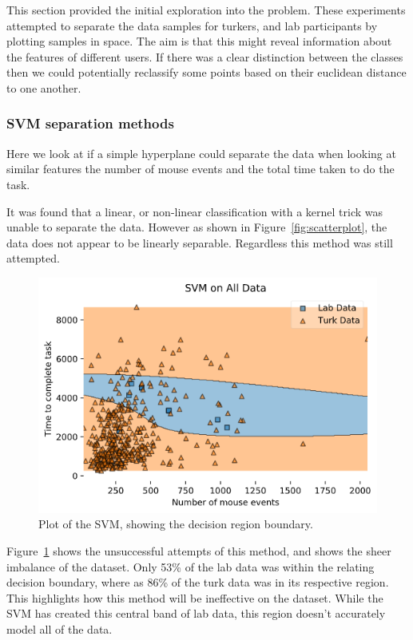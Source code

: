 \documentclass{article}
\begin{document}
This section provided the initial exploration into the problem.
These experiments attempted to separate the data samples for turkers, and lab participants by plotting samples in space.
The aim is that this might reveal information about the features of different users.
If there was a clear distinction between the classes then we could potentially reclassify some points based on their euclidean distance to one another.

\subsubsection{SVM separation methods}
Here we look at if a simple hyperplane could separate the data when looking at similar features the number of mouse events and the total time taken to do the task. 

It was found that a linear, or non-linear classification with a kernel trick was unable to separate the data.
However as shown in Figure~\ref{fig:scatterplot}, the data does not appear to be linearly separable.
Regardless this method was still attempted.

\begin{figure}[ht]
    \centering
    \includegraphics[scale=0.7]{Images/SVM-Decision-Region-Boundary.png}
    \caption{Plot of the SVM, showing the decision region boundary.}
    \label{fig:SVM}
\end{figure}

Figure~\ref{fig:SVM} shows the unsuccessful attempts of this method, and shows the sheer imbalance of the dataset.
Only 53\% of the lab data was within the relating decision boundary, where as 86\% of the turk data was in its respective region.
This highlights how this method will be ineffective on the dataset.
While the SVM has created this central band of lab data, this region doesn't accurately model all of the data. 
\end{document}

